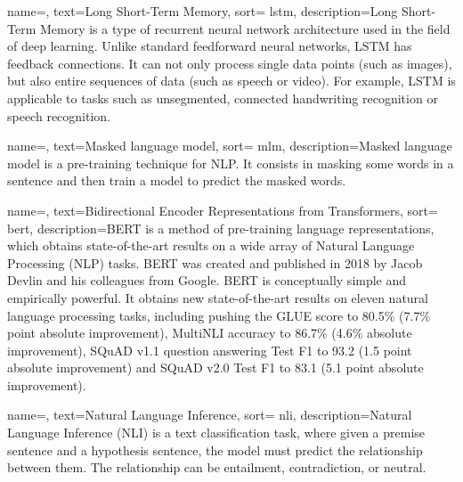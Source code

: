 {
    name=,
    text=Long Short-Term Memory,
    sort= lstm,
    description={Long Short-Term Memory is a type of recurrent neural network architecture used in the field of deep learning. Unlike standard feedforward neural networks, LSTM has feedback connections. It can not only process single data points (such as images), but also entire sequences of data (such as speech or video). For example, LSTM is applicable to tasks such as unsegmented, connected handwriting recognition or speech recognition.}
}

{
    name=,
    text=Masked language model,
    sort= mlm,
    description={Masked language model is a pre-training technique for NLP. It consists in masking some words in a sentence and then train a model to predict the masked words.}
}

{
    name=,
    text=Bidirectional Encoder Representations from Transformers,
    sort= bert,
    description={BERT is a method of pre-training language representations, which obtains state-of-the-art results on a wide array of Natural Language Processing (NLP) tasks. BERT was created and published in 2018 by Jacob Devlin and his colleagues from Google. BERT is conceptually simple and empirically powerful. It obtains new state-of-the-art results on eleven natural language processing tasks, including pushing the GLUE score to 80.5\% (7.7\% point absolute improvement), MultiNLI accuracy to 86.7\% (4.6\% absolute improvement), SQuAD v1.1 question answering Test F1 to 93.2 (1.5 point absolute improvement) and SQuAD v2.0 Test F1 to 83.1 (5.1 point absolute improvement).}
}

{
    name=,
    text=Natural Language Inference,
    sort= nli,
    description={Natural Language Inference (NLI) is a text classification task, where given a premise sentence and a hypothesis sentence, the model must predict the relationship between them. The relationship can be entailment, contradiction, or neutral.}
}

